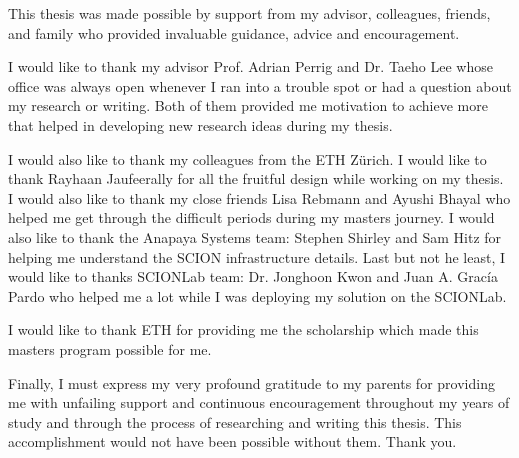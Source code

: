 \documentclass[
11pt, %
english, %
singlespacing, %
headsepline, %
tikz,
oneside,
]{MastersDoctoralThesis} %
\begin{document}
\begin{acknowledgements}
\addchaptertocentry{\acknowledgementname} %
This thesis was made possible by support from my advisor, colleagues, friends, and family who provided invaluable guidance, advice and encouragement.

I would like to thank my advisor Prof. Adrian Perrig and Dr. Taeho Lee whose office was always open whenever I ran into a trouble spot or had a question about my research or writing. Both of them provided me motivation to achieve more that helped in developing new research ideas during my thesis.

I would also like to thank my colleagues from the ETH Z\"urich. I would like to thank Rayhaan Jaufeerally for all the fruitful design while working on my thesis. I would also like to thank my close friends Lisa Rebmann and Ayushi Bhayal who helped me get through the difficult periods during my masters journey. I would also like to thank the Anapaya Systems team: Stephen Shirley and Sam Hitz for helping me understand the SCION infrastructure details. Last but not he least, I would like to thanks SCIONLab team: Dr. Jonghoon Kwon and Juan A. Gracía Pardo who helped me a lot while I was deploying my solution on the SCIONLab.

I would like to thank ETH for providing me the scholarship which made this masters program possible for me.

Finally, I must express my very profound gratitude to my parents for providing me with unfailing support and continuous encouragement throughout my years of study and through the process of researching and writing this thesis. This accomplishment would not have been possible without them. Thank you.

\end{acknowledgements}


\tableofcontents %

\listoffigures %

\listoftables %

\end{document}
